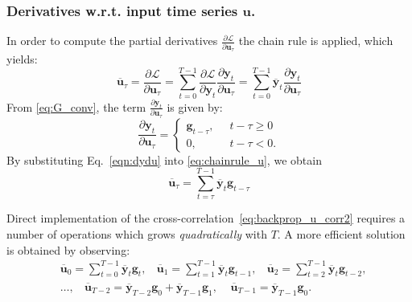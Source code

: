 \documentclass{article}
\newcommand{\adjoint}[1]{\overline{#1}}
\newcommand{\ccorr}{\star}
\newcommand{\tvec}[1]{\mathbf{#1}}
\newcommand{\nsamp}{T}
\newcommand{\pdiff}[2]{\frac{\partial #1}{\partial #2}}
\newcommand{\loss}{\mathcal{L}}
\begin{document}
\subsubsection{Derivatives w.r.t. input time series  $\tvec{u}$.} 
In order to compute the partial derivatives $\pdiff{\loss}{\tvec{u}_\tau} $ the  chain rule is applied, which yields:
\begin{equation}
\label{eq:chainrule_u}
\adjoint{\tvec{u}}_\tau = \pdiff{\loss}{\tvec{u}_\tau} 
= \sum_{t=0}^{\nsamp-1}{\pdiff{\loss}{\tvec{y}_t} \pdiff{\tvec{y}_t}{\tvec{u}_\tau}} 
= \sum_{t=0}^{\nsamp-1}{\adjoint{\tvec{y}}_t \pdiff{\tvec{y}_t}{\tvec{u}_\tau}} 
\end{equation}
From \eqref{eq:G_conv}, the term $\pdiff{\tvec{y}_t}{\tvec{u}_\tau}$ is given by:
\begin{equation} \label{eqn:dydu}
\pdiff{\tvec{y}_t}{\tvec{u}_\tau} = \begin{cases}
\tvec{g}_{t-\tau},\;\; &t-\tau \geq 0\\
0, \; & t-\tau < 0.
\end{cases}
\end{equation}
By substituting Eq.~\eqref{eqn:dydu} into \eqref{eq:chainrule_u}, we obtain 
\begin{equation} \label{eq:backprop_u_corr2}
\adjoint{\tvec{u}}_\tau = 
\sum_{t=\tau}^{\nsamp-1}\adjoint{\tvec{y}}_t 
\tvec{g}_{t-\tau} 
\end{equation}

Direct implementation of the cross-correlation~\eqref{eq:backprop_u_corr2} requires a number of operations which grows \emph{quadratically} with   $\nsamp$. 
A more efficient solution is obtained by observing:
\begin{align*}
& \adjoint{\tvec{u}}_0 = \sum_{t=0}^{\nsamp-1} \adjoint{\tvec{y}}_t \tvec{g}_t, \ \  \ \ 
\adjoint{\tvec{u}}_1 = \sum_{t=1}^{\nsamp-1} \adjoint{\tvec{y}}_t \tvec{g}_{t-1}, \ \ \ \ 
\adjoint{\tvec{u}}_2 = \sum_{t=2}^{\nsamp-1} \adjoint{\tvec{y}}_t \tvec{g}_{t-2}, \\
&\dots, \ \ \ \  \adjoint{\tvec{u}}_{\nsamp-2} = \adjoint{\tvec{y}}_{\nsamp-2} \tvec{g}_0 + \adjoint{\tvec{y}}_{\nsamp-1}\tvec{g}_1, \ \ \ \ \ 
\adjoint{\tvec{u}}_{\nsamp-1} = \adjoint{\tvec{y}}_{\nsamp-1} \tvec{g}_{0}.
\end{align*}
\end{document}
